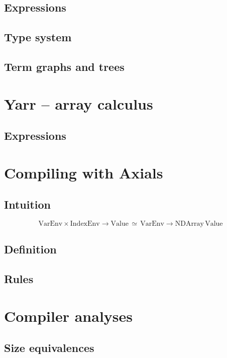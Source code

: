 \subsection{Expressions}

\subsection{Type system}

\subsection{Term graphs and trees}

\section{Yarr -- array calculus}

\subsection{Expressions}

\section{Compiling with Axials}

\subsection{Intuition}

$$ \mathrm{VarEnv} \times \mathrm{IndexEnv} \to \mathrm{Value} \,\simeq\, \mathrm{VarEnv} \to \mathrm{NDArray}\, \mathrm{Value} $$

\subsection{Definition}

\subsection{Rules}

\section{Compiler analyses}

\subsection{Size equivalences}

